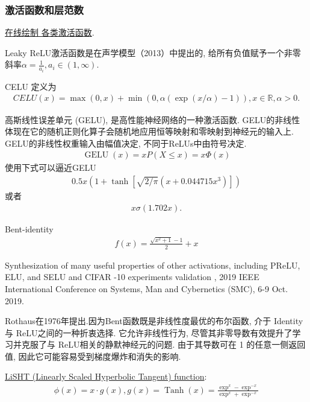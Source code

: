 \subsubsection{激活函数和层范数}
\href{https://dashee87.github.io/deep\%20learning/visualising-activation-functions-in-neural-networks/}{在线绘制 各类激活函数}.
\begin{remark}
Leaky ReLU激活函数是在声学模型（2013）中提出的, 给所有负值赋予一个非零斜率$\alpha=\frac 1 {a_i}, a_i\in (1,\infty)$.
\end{remark}
\begin{remark}
CELU \cite{hendrycks2016gelu} 定义为
\begin{align}
 CELU(x)=\max(0,x)+\min(0,\alpha(\exp(x/\alpha)-1)), x\in \mathbb R, \alpha> 0.
\end{align}
\end{remark}
\begin{remark}
高斯线性误差单元 (GELU), 是高性能神经网络的一种激活函数. GELU的非线性体现在它的随机正则化算子会随机地应用恒等映射和零映射到神经元的输入上.
GELU的非线性权重输入由幅值决定, 不同于ReLUs中由符号决定.
\begin{align}
  \operatorname{GELU}(x)=x P(X \leq x)=x \Phi(x)
\end{align}
使用下式可以逼近GELU
\begin{align}
  0.5 x\left(1+\tanh \left[\sqrt{2 / \pi}\left(x+0.044715 x^{3}\right)\right]\right)
\end{align}
或者
\begin{align}
  x \sigma(1.702 x).
\end{align}
\end{remark}

Bent-identity
\begin{align}
  f(x) = \frac{\sqrt{x^2 + 1} - 1}{2} +x
\end{align}

Synthesization of many useful properties of other activations, including PReLU, ELU, and SELU and CIFAR -10 experiments  validation \cite{Godfrey2019-9846}, 2019 IEEE International Conference on Systems, Man and Cybernetics (SMC), 6-9 Oct. 2019.

Rothaus在1976年提出.因为Bent函数既是非线性度最优的布尔函数, 介于 Identity 与 ReLU之间的一种折衷选择. 它允许非线性行为, 尽管其非零导数有效提升了学习并克服了与 ReLU相关的静默神经元的问题.
由于其导数可在 1 的任意一侧返回值, 因此它可能容易受到梯度爆炸和消失的影响.

\href{https://arxiv.org/pdf/1901.05894.pdf}{LiSHT (Linearly Scaled Hyperbolic Tangent) function}:
\begin{align}
  \phi(x)=x \cdot g(x), g(x)=\operatorname{Tanh}(x)=\frac{\exp ^{x}-\exp ^{-x}}{\exp ^{x}+\exp ^{-x}}
\end{align}



